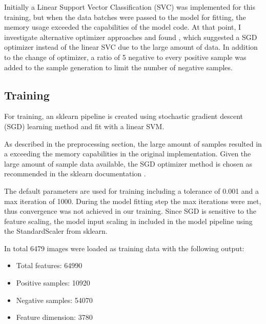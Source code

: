 Initially a Linear Support Vector Classification (SVC)  was implemented for this training, but when the data batches were passed to the model for fitting, the memory usage exceeded the capabilities of the model code. 
At that point, I investigate alternative optimizer approaches and found \cite{sascha2017svm}, which suggested a SGD optimizer instead of the linear SVC due to the large amount of data.
In addition to the change of optimizer, a ratio of 5 negative to every positive sample was added to the sample generation to limit the number of negative samples.

\subsection{Training}

For training, an sklearn \cite{scikit-learn} pipeline is created using stochastic gradient descent (SGD) learning method and fit with a linear SVM. 

As described in the preprocessing section, the large amount of samples resulted in a exceeding the memory capabilities in the original implementation.
Given the large amount of sample data available, the SGD optimizer method is chosen as recommended in the sklearn documentation \cite{scikit-learn-map}.

The default parameters are used for training including a tolerance of 0.001 and a max iteration of 1000.
During the model fitting step the max iterations were met, thus convergence was not achieved in our training. 
Since SGD is sensitive to the feature scaling, the model input scaling in included in the model pipeline using the StandardScaler from sklearn.

In total 6479 images were loaded as training data with the following output:
\begin{itemize}
    \item Total features: 64990
    \item Positive samples: 10920
    \item Negative samples: 54070
    \item Feature dimension: 3780
\end{itemize}